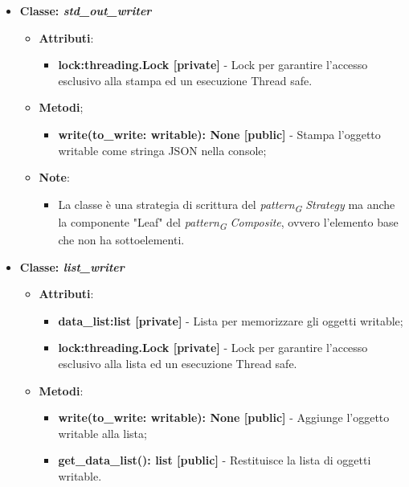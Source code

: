 \begin{itemize}
\begin{itemize}
    \end{itemize}
    \item{\textbf{Classe: \textit{std\_out\_writer}}}
    \begin{itemize}
    \item\textbf{Attributi}:
        \begin{itemize}
        \item \textbf{lock:threading.Lock [private]} - Lock per garantire l'accesso esclusivo alla stampa ed un esecuzione Thread safe.
    \end{itemize}
    \item \textbf{Metodi};
    \begin{itemize}
        \item \textbf{write(to\_write: writable): None [public]} - Stampa l'oggetto writable come stringa JSON nella console;
    \end{itemize}
    \item\textbf{Note}:
        \begin{itemize}
            \item La classe è una strategia di scrittura del \textit{pattern}\textsubscript{\textit{G}} \textit{Strategy} ma anche la componente "Leaf" del \textit{pattern}\textsubscript{\textit{G}} \textit{Composite}, ovvero l'elemento base che non ha sottoelementi.
        \end{itemize}
    \end{itemize}
    \item{\textbf{Classe: \textit{list\_writer}}}
    \begin{itemize}
    \item\textbf{Attributi}:
        \begin{itemize}
        \item \textbf{data\_list:list [private]} - Lista per memorizzare gli oggetti writable;
        \item \textbf{lock:threading.Lock [private]} - Lock per garantire l'accesso esclusivo alla lista ed un esecuzione Thread safe.
    \end{itemize}
    \item \textbf{Metodi}:
    \begin{itemize}
        \item \textbf{write(to\_write: writable): None [public]} - Aggiunge l'oggetto writable alla lista;
        \item \textbf{get\_data\_list(): list [public]} - Restituisce la lista di oggetti writable.
    \end{itemize}

\end{itemize}
\end{itemize}
